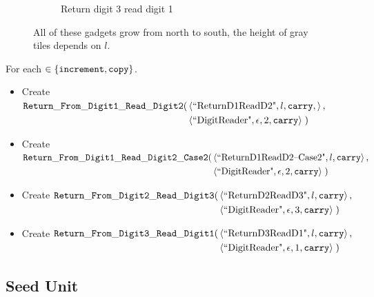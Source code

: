 \begin{figure}[H]
\begin{subfigure}[t]{0.2\textwidth}
                \caption{\label{fig:return_paths/return_digit1_read_digit2_general} Return digit 3 read digit 1}
            \end{subfigure}%
            \caption{\label{fig:return_path_same_row} All of these gadgets grow from north to south, the height of gray tiles depends on $l$.}
        \end{figure}

        \noindent For each {\inc} $\in \{ {\tt increment, copy } \}$.


        \begin{itemize}
            \item Create
            $\begin{aligned}[t]
                {\tt Return\_From\_Digit1\_Read\_Digit2}(& \left \langle \text{``ReturnD1ReadD2"}, l, {\tt carry},       \right\rangle, \\
                                        & \left \langle \text{``DigitReader"}, \epsilon, 2, {\tt carry} \right\rangle \;)
            \end{aligned}$

            \item Create
            $\begin{aligned}[t]
                {\tt Return\_From\_Digit1\_Read\_Digit2\_Case2}(& \left \langle \text{``ReturnD1ReadD2--Case2"}, l, {\tt carry} \right\rangle, \\
                                               & \left \langle \text{``DigitReader"}, \epsilon, 2, {\tt carry} \right\rangle \;)
            \end{aligned}$

            \item Create
            $\begin{aligned}[t]
                {\tt Return\_From\_Digit2\_Read\_Digit3}(& \left \langle \text{``ReturnD2ReadD3"}, l, {\tt carry}        \right\rangle, \\
                                          & \left \langle \text{``DigitReader"}, \epsilon, 3, {\tt carry} \right\rangle \;)
            \end{aligned}$

            \item Create
            $\begin{aligned}[t]
                 {\tt Return\_From\_Digit3\_Read\_Digit1}(& \left \langle \text{``ReturnD3ReadD1"}, l, {\tt carry}        \right \rangle, \\
                                           & \left \langle \text{``DigitReader"}, \epsilon, 1, {\tt carry} \right \rangle \;)
            \end{aligned}$

        \end{itemize}

\subsection{Seed Unit}

